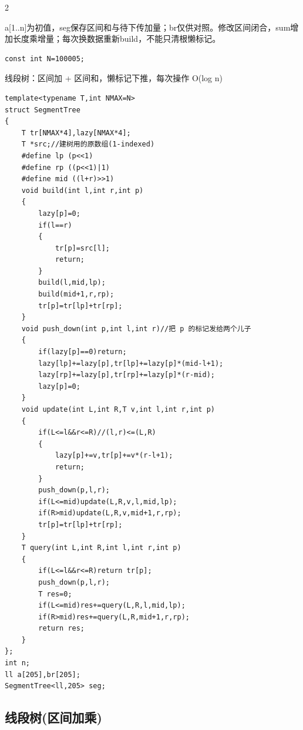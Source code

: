 \documentclass[UTF8,fontset=fandol,a4paper,twoside]{ctexart}
\newcommand{\note}[1]{{\fontsize{10}{12}\selectfont #1\par}}
\begin{document}
\begin{multicols}{2}
\note{a[\allowbreak{}1.\allowbreak{}.\allowbreak{}n]\allowbreak{}为初值，seg保存区间和与待下传加量；br仅供对照。修改区间闭合，sum增加长度乘增量；每次换数据重新build，不能只清根懒标记。}
\begin{lstlisting}
const int N=100005;
\end{lstlisting}
\note{线段树：区间加 +\allowbreak{} 区间和，懒标记下推，每次操作 O(\allowbreak{}log n)\allowbreak{}}
\begin{lstlisting}
template<typename T,int NMAX=N>
struct SegmentTree
{
    T tr[NMAX*4],lazy[NMAX*4];
    T *src;//建树用的原数组(1-indexed)
    #define lp (p<<1)
    #define rp ((p<<1)|1)
    #define mid ((l+r)>>1)
    void build(int l,int r,int p)
    {
        lazy[p]=0;
        if(l==r)
        {
            tr[p]=src[l];
            return;
        }
        build(l,mid,lp);
        build(mid+1,r,rp);
        tr[p]=tr[lp]+tr[rp];
    }
    void push_down(int p,int l,int r)//把 p 的标记发给两个儿子
    {
        if(lazy[p]==0)return;
        lazy[lp]+=lazy[p],tr[lp]+=lazy[p]*(mid-l+1);
        lazy[rp]+=lazy[p],tr[rp]+=lazy[p]*(r-mid);
        lazy[p]=0;
    }
    void update(int L,int R,T v,int l,int r,int p)
    {
        if(L<=l&&r<=R)//(l,r)<=(L,R)
        {
            lazy[p]+=v,tr[p]+=v*(r-l+1);
            return;
        }
        push_down(p,l,r);
        if(L<=mid)update(L,R,v,l,mid,lp);
        if(R>mid)update(L,R,v,mid+1,r,rp);
        tr[p]=tr[lp]+tr[rp];
    }
    T query(int L,int R,int l,int r,int p)
    {
        if(L<=l&&r<=R)return tr[p];
        push_down(p,l,r);
        T res=0;
        if(L<=mid)res+=query(L,R,l,mid,lp);
        if(R>mid)res+=query(L,R,mid+1,r,rp);
        return res;
    }
};
int n;
ll a[205],br[205];
SegmentTree<ll,205> seg;
\end{lstlisting}
\subsection{线段树(区间加乘)}


\end{multicols}
\end{document}
